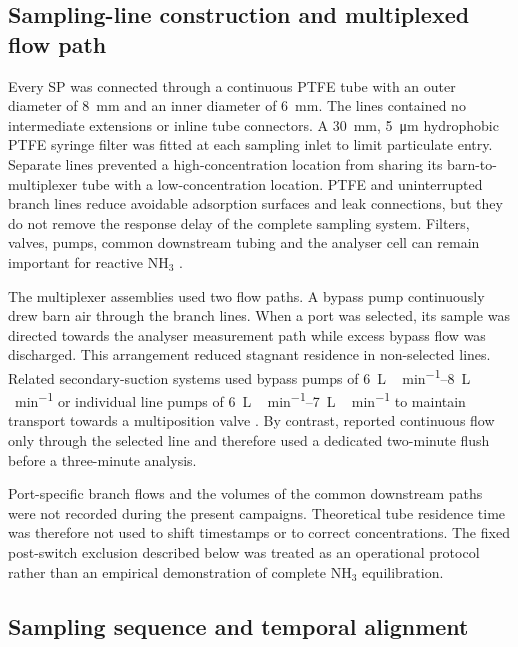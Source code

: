 \documentclass[12pt,a4paper]{article}
\begin{document}
\subsection{Sampling-line construction and multiplexed flow path}

Every SP was connected through a continuous PTFE tube with an outer diameter of \SI{8}{mm} and an inner diameter of \SI{6}{mm}. The lines contained no intermediate extensions or inline tube connectors. A \SI{30}{mm}, \SI{5}{\micro\metre} hydrophobic PTFE syringe filter was fitted at each sampling inlet to limit particulate entry. Separate lines prevented a high-concentration location from sharing its barn-to-multiplexer tube with a low-concentration location. PTFE and uninterrupted branch lines reduce avoidable adsorption surfaces and leak connections, but they do not remove the response delay of the complete sampling system. Filters, valves, pumps, common downstream tubing and the analyser cell can remain important for reactive \(\mathrm{NH_3}\) \citep{Rom2010,Kamp2019,Zhuang2020}.

The multiplexer assemblies used two flow paths. A bypass pump continuously drew barn air through the branch lines. When a port was selected, its sample was directed towards the analyser measurement path while excess bypass flow was discharged. This arrangement reduced stagnant residence in non-selected lines. Related secondary-suction systems used bypass pumps of \SIrange{6}{8}{L\,min^{-1}} or individual line pumps of \SIrange{6}{7}{L\,min^{-1}} to maintain transport towards a multiposition valve \citep{Rom2010,Kamp2019}. By contrast, \citet{Koenig2018} reported continuous flow only through the selected line and therefore used a dedicated two-minute flush before a three-minute analysis.

Port-specific branch flows and the volumes of the common downstream paths were not recorded during the present campaigns. Theoretical tube residence time was therefore not used to shift timestamps or to correct concentrations. The fixed post-switch exclusion described below was treated as an operational protocol rather than an empirical demonstration of complete \(\mathrm{NH_3}\) equilibration.

\subsection{Sampling sequence and temporal alignment}
\end{document}
